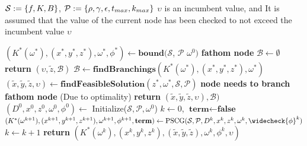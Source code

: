 \begin{algorithm}[H]
\begin{algorithmic}
 \State \quad\quad$\mathcal{S}:=\left\{ f,K,B \right \}$, $\mathcal{P}:=\left\{ \rho,\gamma, \epsilon, t_{max}, k_{max} \right \}$
 \State \quad\quad$\upsilon$ is an incumbent value, and 
 \State \quad\quad It is assumed that the value of the current node has been checked to not exceed the incumbent value $\upsilon$ 
\end{algorithmic}
\begin{algorithmic}
  \State $\left(K^{*}(\omega^*),(x^{*},y^*,z^{*}),\omega^{*},{\phi}^{*}\right) \gets \textbf{bound}(\mathcal{S}$, $\mathcal{P}$ $\omega^0)$
{}
 \State \textbf{fathom node}
 \State $\mathcal{B} \gets \emptyset$
 \State \textbf{return} $(\upsilon, \widetilde{z}, \mathcal{B})$
\EndIf
\State $\mathcal{B} \gets \textbf{findBranchings}(K^{*}(\omega^*),(x^{*},y^*,z^{*}),\omega^{*})$
\State $(\widetilde{x},\widetilde{y},\widetilde{z},\upsilon) \gets \textbf{findFeasibleSolution}(z^{*},\omega^{*},\mathcal{S},\mathcal{P})$ %
\State \textbf{node needs to branch}
\Else
\State \textbf{fathom node}  (Due to optimality)
\EndIf
\State \textbf{return} $(\widetilde{x},\widetilde{y},\widetilde{z},\upsilon), \mathcal{B})$
\EndFunction
{}
\State $(D^0,x^0,z^0,\omega^0,{\phi}^0) \gets$ Initialize($\mathcal{S},\mathcal{P},\omega^0$)
\State $k \gets 0$, $\textbf{term}\gets\textbf{false}$
 \State $(K^*(\omega^{k+1}), (x^{k+1},y^{k+1},z^{k+1}),\omega^{k+1},{\phi}^{k+1}, \textbf{term}) \gets \text{PSCG}(\mathcal{S},\mathcal{P},D^k,x^k,z^k,\omega^k,\widecheck{\phi}^k)$
 \State $k \gets k+1$
\EndWhile
\State \textbf{return} $\left(K^*(\omega^{k}), (x^{k},y^{k},z^{k}),(\widetilde{x},\widetilde{y},\widetilde{z}),\omega^{k},{\phi}^{k},\upsilon\right)$
\EndFunction
\end{algorithmic}
\end{algorithm}



